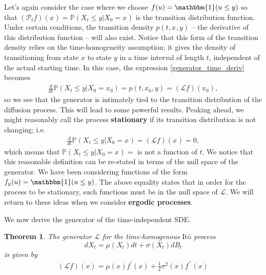 \documentclass[12pt]{article}
\newcommand{\Prob}{\mathbb{P}}
\newcommand{\state}[1][t]{X_{#1}}
\newcommand{\stateValue}[1][t]{x_{#1}}
\newcommand{\BM}[1][t]{B_{#1}} %
\newcommand{\op}[1][t]{\mathcal{P}_{#1}} %
\newcommand{\gen}{\mathcal{L}} %
\newcommand{\ito}{\text{It}\hat{\text{o}}}
\newtheorem{thm}{Theorem}
\begin{document}
Let's again consider the case where we choose $f(u) = \mathbbm{1}(u \leq y)$ so that $(\op f)(\stateValue[]) = \Prob(\state \leq y | \state[0] = \stateValue[])$ is the 
transition distribution function. Under certain conditions, the transition density $p(t, \stateValue[], y)$ -- the derivative of this distribution function -- will also exist. 
Notice that this form of the transition density relies on the time-homogeneity assumption; it gives the density of transitioning from state $x$ to state $y$ in a time 
interval of length $t$, independent of the actual starting time. In this case, the expression \ref{generator_time_deriv} becomes 
\begin{align*}
\frac{d}{dt} \Prob(\state \leq y | \state[0] = \stateValue[0]) = p(t, \stateValue[0], y) = (\gen f)(\stateValue[0]), 
\end{align*}
so we see that the generator is intimately tied to the transition distribution of the diffusion process. 
This will lead to some powerful results. Peaking ahead, we might 
reasonably call the process \textbf{stationary} if its transition distribution is not changing; i.e. 
\begin{align*}
\frac{d}{dt} \Prob(\state \leq y | \state[0] = \stateValue[]) = (\gen f)(\stateValue[]) = 0,
\end{align*} 
which means that $\Prob(\state \leq y | \state[0] = \stateValue[]) = $ is not a function of $t$. We notice that this reasonable definition can be 
re-stated in terms of the null space of the generator. We have been considering functions of the form $f_y(u) = \mathbbm{1}(u \leq y)$. The above 
equality states that in order for the process to be stationary, such functions must be in the null space of $\gen$. We will return to these ideas when we consider
\textbf{ergodic processes}. 

We now derive the generator of the time-independent SDE. 
\begin{thm} 
The generator $\gen$ for the time-homogenous $\ito$ process 
\[ d\state = \mu(\state) dt + \sigma(\state) d\BM \] 
is given by 
\begin{align}
(\gen f)(x) = \mu(x) f^\prime(x) + \frac{1}{2} \sigma^2(x) f^{\prime\prime}(x) 
\end{align}

\end{thm}
\end{document}
